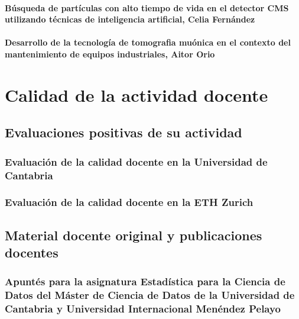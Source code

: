 \documentclass[a4paper, 11pt, twoside, openright]{report}
\begin{document}
\paragraph{Búsqueda de partículas con alto tiempo de vida en el detector CMS utilizando técnicas de inteligencia artificial, Celia Fernández}


\paragraph{Desarrollo de la tecnología de tomografia muónica en el contexto del mantenimiento de equipos industriales, Aitor Orio}


\section{Calidad de la actividad docente}

\subsection{Evaluaciones positivas de su actividad}

\subsubsection{Evaluación de la calidad docente en la Universidad de Cantabria}


\subsubsection{Evaluación de la calidad docente en la ETH Zurich}


\subsection{Material docente original y publicaciones docentes}

\subsubsection{Apuntés para la asignatura Estadística para la Ciencia de Datos del Máster de Ciencia de Datos de la Universidad de Cantabria y Universidad Internacional Menéndez Pelayo}

\end{document}
